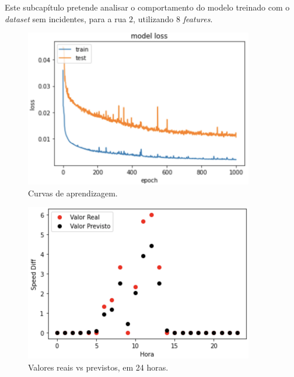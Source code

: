 \documentclass[a4paper, 12pt]{article}
\begin{document}
Este subcapítulo pretende analisar o comportamento do modelo treinado com o \textit{dataset} sem incidentes, para a rua $2$, utilizando $8$ \textit{features}.

\begin{figure}[H]
	\centering
	\includegraphics[width=10cm]{resultados/aprend_no_inc.png}
	\caption{Curvas de aprendizagem.}
\end{figure}

\begin{figure}[H]
	\centering
	\includegraphics[width=10cm]{resultados/prev_real_no_inc.png}
	\caption{Valores reais vs previstos, em 24 horas.}
\end{figure}
\end{document}
